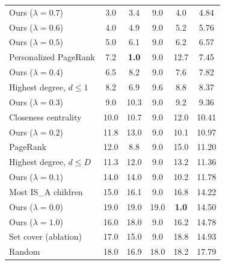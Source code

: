 \begin{table}[p]
\begin{tabular}{@{}lccccc@{}}
Ours ($\lambda = 0.7$) & 3.0 & 3.4 & 9.0 & 4.0 & 4.84 \\
Ours ($\lambda = 0.6$) & 4.0 & 4.9 & 9.0 & 5.2 & 5.76 \\
Ours ($\lambda = 0.5$) & 5.0 & 6.1 & 9.0 & 6.2 & 6.57 \\
Personalized PageRank & 7.2 & \textbf{1.0} & 9.0 & 12.7 & 7.45 \\
Ours ($\lambda = 0.4$) & 6.5 & 8.2 & 9.0 & 7.6 & 7.82 \\
Highest degree, $d \le 1$ & 8.2 & 6.9 & 9.6 & 8.8 & 8.37 \\
Ours ($\lambda = 0.3$) & 9.0 & 10.3 & 9.0 & 9.2 & 9.36 \\
Closeness centrality & 10.0 & 10.7 & 9.0 & 12.0 & 10.41 \\
Ours ($\lambda = 0.2$) & 11.8 & 13.0 & 9.0 & 10.1 & 10.97 \\
PageRank & 12.0 & 8.8 & 9.0 & 15.0 & 11.20 \\
Highest degree, $d \le D$ & 11.3 & 12.0 & 9.0 & 13.2 & 11.36 \\
Ours ($\lambda = 0.1$) & 14.0 & 14.0 & 9.0 & 10.2 & 11.78 \\
Most IS\_A children & 15.0 & 16.1 & 9.0 & 16.8 & 14.22 \\
Ours ($\lambda = 0.0$) & 19.0 & 19.0 & 19.0 & \textbf{1.0} & 14.50 \\
Ours ($\lambda = 1.0$) & 16.0 & 18.0 & 9.0 & 16.2 & 14.78 \\
Set cover (ablation) & 17.0 & 15.0 & 9.0 & 18.8 & 14.93 \\
Random & 18.0 & 16.9 & 18.0 & 18.2 & 17.79 \\
\bottomrule
\end{tabular}
\end{table}

